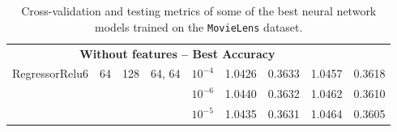 \begin{table}[H]
\begin{tabular}{lcclccccc}
\midrule
\multicolumn{8}{c}{\textbf{Without features -- Best Accuracy}}\\\addlinespace
RegressorRelu6 & 64 & 128 & 64, 64 & $10^{-4}$ &  1.0426 &      0.3633 &   1.0457 &        0.3618 \\
 &    &     &     & $10^{-6}$ &  1.0440 &      0.3632 &   1.0462 &        0.3610 \\
  &    &     &   & $10^{-5}$ &  1.0435 &      0.3631 &   1.0464 &        0.3605 \\
           
           

\bottomrule
\end{tabular}
\caption{Cross-validation and testing metrics of some of the best neural network models trained on the \texttt{MovieLens} dataset. }
\label{tab:results.nn}
\end{table}
